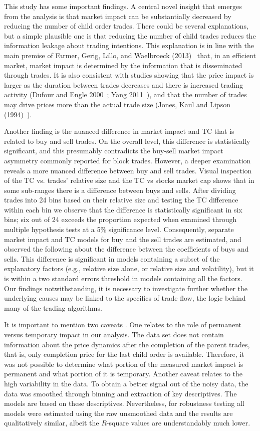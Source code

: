 This study has some important findings. A central novel insight that emerges from the analysis is that market impact can be substantially decreased by reducing the number of child order trades. There could be several explanations, but a simple plausible one is that reducing the number of child trades reduces the information leakage about trading intentions. This explanation is in line with the main premise of Farmer, Gerig, Lillo, and Waelbroeck (2013)~\cite{farmer2012} that, in an efficient market, market impact is determined by the information that is disseminated through trades. It is also consistent with studies showing that the price impact is larger as the duration between trades decreases and there is increased trading activity (Dufour and Engle 2000~\cite{dufour}; Yang 2011~\cite{yang2011}), and that the number of trades may drive prices more than the actual trade size (Jones, Kaul and Lipson (1994)~\cite{jones1994}).


Another finding is the nuanced difference in market impact and TC that is related to buy and sell trades. On the overall level, this difference is statistically significant, and this presumably contradicts the buy-sell market impact asymmetry commonly reported for block trades. However, a deeper examination reveals a more nuanced difference between buy and sell trades. Visual inspection of the TC vs. trades' relative size and the TC vs stocks market cap shows that in some sub-ranges there is a difference between buys and sells. After dividing trades into 24 bins based on their relative size and testing the TC difference within each bin we observe that the difference is statistically significant in six bins; six out of 24 exceeds the proportion expected when examined through multiple hypothesis tests at a 5\% significance level. Consequently, separate market impact and TC models for buy and the sell trades are estimated, and observed the following about the difference between the coefficients of buys and sells. This difference is significant in models containing a subset of the explanatory factors (e.g., relative size alone, or relative size and volatility), but it is within a two standard errors threshold in models containing all the factors. Our findings notwithstanding, it is necessary to investigate further whether the underlying causes may be linked to the specifics of trade flow, the logic behind many of the trading algorithms.


It is important to mention two caveats . One relates to the role of permanent versus temporary impact in our analysis. The data set does not contain information about the price dynamics after the completion of the parent trades, that is, only completion price for the last child order is available. Therefore, it was not possible to determine what portion of the measured market impact is permanent and what portion of it is temporary. Another caveat relates to the high variability in the data. To obtain a better signal out of the noisy data, the data was smoothed through binning and extraction of key descriptives. The models are based on these descriptives. Nevertheless, for robustness testing all models were estimated using the raw unsmoothed data and the results are qualitatively similar, albeit the $R$-square values are understandably much lower. \twomedskip


